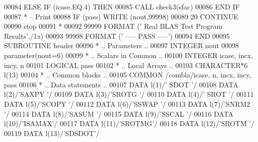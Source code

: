 \begin{DoxyCode}
00084          \textcolor{keywordflow}{ELSE} \textcolor{keywordflow}{IF} (icase.EQ.4) \textcolor{keywordflow}{THEN}
00085             \textcolor{keyword}{CALL }check3(sfac)
00086 \textcolor{keywordflow}{         END IF}
00087 \textcolor{comment}{*        -- Print}
00088          \textcolor{keywordflow}{IF} (pass) \textcolor{keyword}{WRITE} (nout,99998)
00089    20 \textcolor{keywordflow}{CONTINUE}
00090       stop
00091 \textcolor{comment}{*}
00092 99999 \textcolor{keyword}{FORMAT} (\textcolor{stringliteral}{' Real BLAS Test Program Results'},/1x)
00093 99998 \textcolor{keyword}{FORMAT} (\textcolor{stringliteral}{'                                    ----- PASS -----'})
00094 \textcolor{keyword}{      END}
00095 \textcolor{keyword}{      SUBROUTINE }header
00096 \textcolor{comment}{*     .. Parameters ..}
00097       \textcolor{keywordtype}{INTEGER}          nout
00098       parameter(nout=6)
00099 \textcolor{comment}{*     .. Scalars in Common ..}
00100       \textcolor{keywordtype}{INTEGER}          icase, incx, incy, n
00101       \textcolor{keywordtype}{LOGICAL}          pass
00102 \textcolor{comment}{*     .. Local Arrays ..}
00103       \textcolor{keywordtype}{CHARACTER*6}      l(13)
00104 \textcolor{comment}{*     .. Common blocks ..}
00105       \textcolor{keyword}{COMMON}           /combla/icase, n, incx, incy, pass
00106 \textcolor{comment}{*     .. Data statements ..}
00107       \textcolor{keyword}{DATA}             l(1)/\textcolor{stringliteral}{' SDOT '}/
00108       \textcolor{keyword}{DATA}             l(2)/\textcolor{stringliteral}{'SAXPY '}/
00109       \textcolor{keyword}{DATA}             l(3)/\textcolor{stringliteral}{'SROTG '}/
00110       \textcolor{keyword}{DATA}             l(4)/\textcolor{stringliteral}{' SROT '}/
00111       \textcolor{keyword}{DATA}             l(5)/\textcolor{stringliteral}{'SCOPY '}/
00112       \textcolor{keyword}{DATA}             l(6)/\textcolor{stringliteral}{'SSWAP '}/
00113       \textcolor{keyword}{DATA}             l(7)/\textcolor{stringliteral}{'SNRM2 '}/
00114       \textcolor{keyword}{DATA}             l(8)/\textcolor{stringliteral}{'SASUM '}/
00115       \textcolor{keyword}{DATA}             l(9)/\textcolor{stringliteral}{'SSCAL '}/
00116       \textcolor{keyword}{DATA}             l(10)/\textcolor{stringliteral}{'ISAMAX'}/
00117       \textcolor{keyword}{DATA}             l(11)/\textcolor{stringliteral}{'SROTMG'}/
00118       \textcolor{keyword}{DATA}             l(12)/\textcolor{stringliteral}{'SROTM '}/
00119       \textcolor{keyword}{DATA}             l(13)/\textcolor{stringliteral}{'SDSDOT'}/

\end{DoxyCode}

